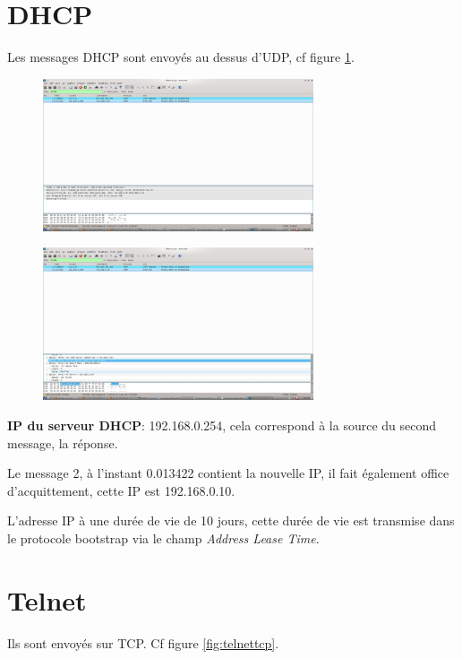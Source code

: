 \documentclass[12pt,a4paper,openany]{article}
\begin{document}
	\maketitle
	\section{DHCP}
	Les messages DHCP sont envoyés au dessus d'UDP, cf figure \ref{fig:dhcpudp}.
	\begin{figure}[H]
		\centering
		\includegraphics[width=8cm]{capture1.jpeg}
		\label{fig:dhcpudp}
	\end{figure}

	\begin{figure}[H]
		\centering
		\includegraphics[width=8cm]{capture2.jpeg}
	\end{figure}

	\textbf{IP du serveur DHCP}: 192.168.0.254, cela correspond à la source du second message, la réponse.

	Le message \No{}2, à l'instant 0.013422 contient la nouvelle IP, il fait également office d'acquittement, cette IP est 192.168.0.10.

	L'adresse IP à une durée de vie de 10 jours, cette durée de vie est transmise dans le protocole bootstrap via le champ \textit{Address Lease Time}.

	\section{Telnet}
	Ils sont envoyés sur TCP. Cf figure \ref{fig:telnettcp}.
	
\end{document}
